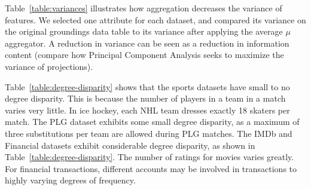 \documentclass[conference]{IEEEtran}
\begin{document}
Table~\ref{table:variances} illustrates how aggregation decreases the variance of features. We selected one attribute for each dataset, and compared its variance on the original groundings data table to its variance after applying the average $\mu$ aggregator. A reduction in variance can be seen as a reduction in information content (compare how Principal Component Analysis seeks to maximize the variance of projections).

\begin{table}[ht]
\caption{Feature Variance  vs. Average Feature Variance}
\centering
{}
\label{table:variances}
\end{table}


Table~\ref{table:degree-disparity} shows that the sports datasets have small to no degree disparity. This is because the number of players in a team in a match varies very little. In ice hockey, each NHL team dresses exactly 18 skaters per match.
The PLG dataset exhibits some small degree disparity, as a maximum of three substitutions per team are allowed during PLG matches.  The IMDb and Financial datasets exhibit considerable degree disparity, as shown in Table~\ref{table:degree-disparity}. The number of ratings for movies varies greatly. For financial transactions, different accounts may be involved in transactions to highly varying degrees of frequency.
\end{document}
